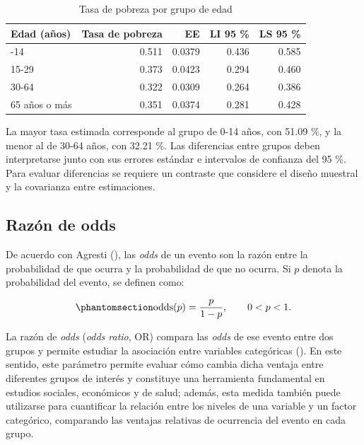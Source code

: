 \documentclass[
  spanish,
  11pt,
  letterpaper,
  oneside,
  open=any]{scrbook}
\begin{document}
{

\begin{longtable}[]{@{}lrrrr@{}}

\caption{\label{tbl-pobreza-edad}Tasa de pobreza por grupo de edad}

\tabularnewline

\toprule\noalign{}
Edad (años) & Tasa de pobreza & EE & LI 95 \% & LS 95 \% \\
\midrule\noalign{}
\endhead
\bottomrule\noalign{}
\endlastfoot
0-14 & 0.511 & 0.0379 & 0.436 & 0.585 \\
15-29 & 0.373 & 0.0423 & 0.294 & 0.460 \\
30-64 & 0.322 & 0.0309 & 0.264 & 0.386 \\
65 años o más & 0.351 & 0.0374 & 0.281 & 0.428 \\

\end{longtable}

}

La mayor tasa estimada corresponde al grupo de 0-14 años, con 51.09 \%,
y la menor al de 30-64 años, con 32.21 \%. Las diferencias entre grupos
deben interpretarse junto con sus errores estándar e intervalos de
confianza del 95 \%. Para evaluar diferencias se requiere un contraste
que considere el diseño muestral y la covarianza entre estimaciones.

\subsection{Razón de odds}\label{la-razon-de-odds}

De acuerdo con Agresti (), las
\emph{odds} de un evento son la razón entre la probabilidad de que
ocurra y la probabilidad de que no ocurra. Si \(p\) denota la
probabilidad del evento, se definen como:

\begin{equation}\protect\phantomsection\label{eq-odds}{
\operatorname{odds}(p)=\frac{p}{1-p},\qquad 0<p<1.
}\end{equation}

La razón de \emph{odds} (\emph{odds ratio}, OR) compara las \emph{odds}
de ese evento entre dos grupos y permite estudiar la asociación entre
variables categóricas (). En este sentido, este parámetro permite evaluar cómo
cambia dicha ventaja entre diferentes grupos de interés y constituye una
herramienta fundamental en estudios sociales, económicos y de salud;
además, esta medida también puede utilizarse para cuantificar la
relación entre los niveles de una variable y un factor categórico,
comparando las ventajas relativas de ocurrencia del evento en cada
grupo.
\end{document}
